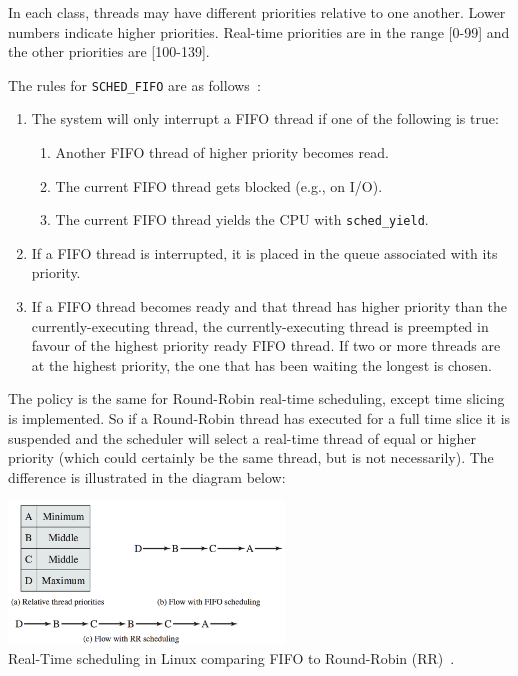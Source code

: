 In each class, threads may have different priorities relative to one another. Lower numbers indicate higher priorities. Real-time priorities are in the range [0-99] and the other priorities are [100-139].

The rules for \texttt{SCHED\_FIFO} are as follows~\cite{osi}:

\begin{enumerate}
	\item The system will only interrupt a FIFO thread if one of the following is true:
	\begin{enumerate}
		\item Another FIFO thread of higher priority becomes read.
		\item The current FIFO thread gets blocked (e.g., on I/O).
		\item The current FIFO thread yields the CPU with \texttt{sched\_yield}.
	\end{enumerate}
	\item If a FIFO thread is interrupted, it is placed in the queue associated with its priority.
	\item If a FIFO thread becomes ready and that thread has higher priority than the currently-executing thread, the currently-executing thread is preempted in favour of the highest priority ready FIFO thread. If two or more threads are at the highest priority, the one that has been waiting the longest is chosen.
\end{enumerate}

The policy is the same for Round-Robin real-time scheduling, except time slicing is implemented. So if a Round-Robin thread has executed for a full time slice it is suspended and the scheduler will select a real-time thread of equal or higher priority (which could certainly be the same thread, but is not necessarily). The difference is illustrated in the diagram below:

\begin{center}
	\includegraphics[width=0.55\textwidth]{images/linux-rts.png}\\
	Real-Time scheduling in Linux comparing FIFO to Round-Robin (RR)~\cite{osi}.
\end{center}

